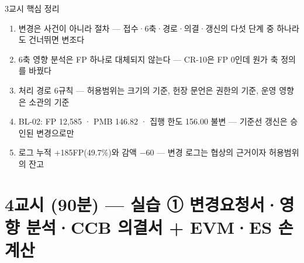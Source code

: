 \begin{frame}{3교시 핵심 정리}
\begin{enumerate}
\item 변경은 사건이 아니라 절차 — 접수·6축·경로·의결·갱신의 다섯 단계 중 하나라도 건너뛰면 변조다
\item 6축 영향 분석은 FP 하나로 대체되지 않는다 — CR-10은 FP 0인데 원가 축 정의를 바꿨다
\item 처리 경로 6규칙 — 허용범위는 크기의 기준, 헌장 문언은 권한의 기준, 운영 영향은 소관의 기준
\item BL-02: FP 12,585 · PMB 146.82 · 집행 한도 156.00 불변 — 기준선 갱신은 승인된 변경으로만
\item 로그 누적 +185FP(49.7\%)와 감액 $-$60 — 변경 로그는 협상의 근거이자 허용범위의 잔고
\end{enumerate}
\end{frame}

\section{4교시 (90분) — 실습 ① 변경요청서·영향 분석·CCB 의결서 + EVM·ES 손계산}

